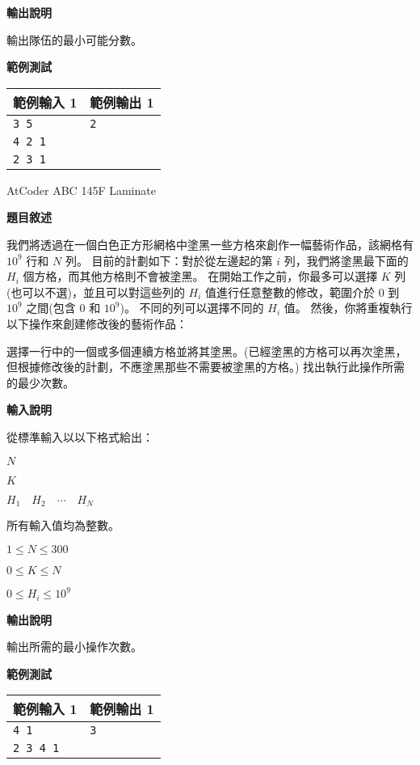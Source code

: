     \textbf{輸出說明}

    輸出隊伍的最小可能分數。

    \textbf{範例測試}

    \begin{tabular}{|m{7cm}|m{7cm}|}
        \hline
        範例輸入 1 & 範例輸出 1 \\
        \hline
        \verb|3 5| & \verb|2| \\
        \verb|4 2 1| & \\
        \verb|2 3 1| & \\
        \hline
    \end{tabular}

    \problem AtCoder ABC 145F Laminate

    \textbf{題目敘述}

    我們將透過在一個白色正方形網格中塗黑一些方格來創作一幅藝術作品，該網格有 $10^9$ 行和 $N$ 列。
    目前的計劃如下：對於從左邊起的第 $i$ 列，我們將塗黑最下面的 $H_i$ 個方格，而其他方格則不會被塗黑。
    在開始工作之前，你最多可以選擇 $K$ 列(也可以不選)，並且可以對這些列的 $H_i$ 值進行任意整數的修改，範圍介於 $0$ 到 $10^9$ 之間(包含 $0$ 和 $10^9$)。
    不同的列可以選擇不同的 $H_i$ 值。
    然後，你將重複執行以下操作來創建修改後的藝術作品：

    選擇一行中的一個或多個連續方格並將其塗黑。(已經塗黑的方格可以再次塗黑，但根據修改後的計劃，不應塗黑那些不需要被塗黑的方格。)
    找出執行此操作所需的最少次數。

    \textbf{輸入說明}

    從標準輸入以以下格式給出：

    $N$
    
    $K$
    
    $H_1 \quad H_2 \quad \cdots \quad H_N$
    
    所有輸入值均為整數。
    
    $1\le N\le 300$
    
    $0\le K\le N$
    
    $0\le H_i\le 10^9$

    \textbf{輸出說明}

    輸出所需的最小操作次數。

    \textbf{範例測試}

    \begin{tabular}{|m{7cm}|m{7cm}|}
        \hline
        範例輸入 1 & 範例輸出 1 \\
        \hline
        \verb|4 1| & \verb|3| \\
        \verb|2 3 4 1| & \\
        \hline
    \end{tabular}
    
